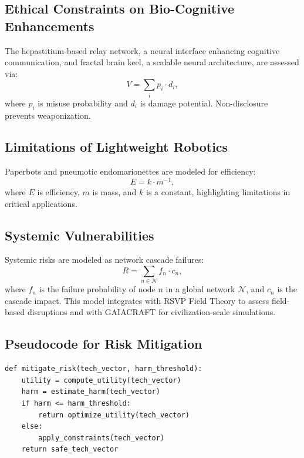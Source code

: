 \documentclass[11pt,oneside]{memoir}
\theoremstyle{plain}
\begin{document}
\subsection{Ethical Constraints on Bio-Cognitive Enhancements}
The hepastitium-based relay network, a neural interface enhancing cognitive communication, and fractal brain keel, a scalable neural architecture, are assessed via:
\begin{equation}
    V = \sum_{i} p_i \cdot d_i,
\end{equation}
where \(p_i\) is misuse probability and \(d_i\) is damage potential. Non-disclosure prevents weaponization.

\subsection{Limitations of Lightweight Robotics}
Paperbots and pneumotic endomarionettes are modeled for efficiency:
\begin{equation}
    E = k \cdot m^{-1},
\end{equation}
where \(E\) is efficiency, \(m\) is mass, and \(k\) is a constant, highlighting limitations in critical applications.

\subsection{Systemic Vulnerabilities}
Systemic risks are modeled as network cascade failures:
\begin{equation}
    R = \sum_{n \in \mathcal{N}} f_n \cdot c_n,
\end{equation}
where \(f_n\) is the failure probability of node \(n\) in a global network \(\mathcal{N}\), and \(c_n\) is the cascade impact. This model integrates with RSVP Field Theory to assess field-based disruptions and with GAIACRAFT for civilization-scale simulations.

\subsection{Pseudocode for Risk Mitigation}
\begin{lstlisting}
def mitigate_risk(tech_vector, harm_threshold):
    utility = compute_utility(tech_vector)
    harm = estimate_harm(tech_vector)
    if harm <= harm_threshold:
        return optimize_utility(tech_vector)
    else:
        apply_constraints(tech_vector)
    return safe_tech_vector
\end{lstlisting}
\end{document}
